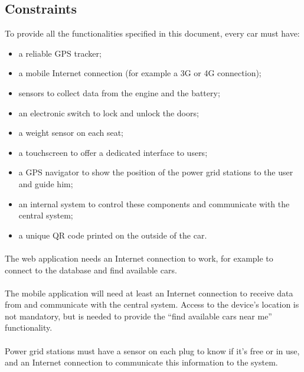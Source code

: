 \documentclass[english]{article}
\begin{document}
\newpage
\subsection{Constraints}\label{constraints}

To provide all the functionalities specified in this document, every car must have:
\begin{itemize}
	\item{a reliable GPS tracker;}
	\item{a mobile Internet connection (for example a 3G or 4G connection);}
	\item{sensors to collect data from the engine and the battery;}
	\item{an electronic switch to lock and unlock the doors;}
	\item{a weight sensor on each seat;}
	\item{a touchscreen to offer a dedicated interface to users;}
	\item{a GPS navigator to show the position of the power grid stations to the user and guide him;}
	\item{an internal system to control these components and communicate with the central system;}
	\item{a unique QR code printed on the outside of the car.}
\end{itemize}

\paragraph{}
The web application needs an Internet connection to work, for example to connect to the database and find available cars.

\paragraph{}
The mobile application will need at least an Internet connection to receive data from and communicate with the central system. Access to the device’s location is not mandatory, but is needed to provide the “find available cars near me” functionality.

\paragraph{}
Power grid stations must have a sensor on each plug to know if it's free or in use, and an Internet connection to communicate this information to the system.
\end{document}
